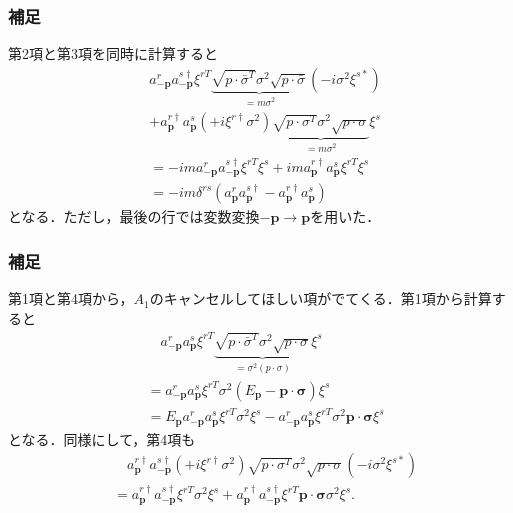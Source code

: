 \documentclass[pdflatex,unicode,ja=standard,12pt]{beamer}
\begin{document}
\begin{frame}[noframenumbering]
  
  \frametitle{補足\ \subsecname}
  \thispagestyle{empty}

  第2項と第3項を同時に計算すると
  \begin{align}
    &
    a_{-\mathbf{p}}^ra_{-\mathbf{p}}^{s\dag}
    \xi^{rT}
    \underbrace{
      \sqrt{p\cdot\bar{\sigma}^{T}}
      \sigma^2
      \sqrt{p\cdot\bar{\sigma}}
    }_{=m\sigma^2}
    (-i\sigma^2\xi^{s*})
    \nonumber
    \\
    &
    +
    a_{\mathbf{p}}^{r\dag}a_{\mathbf{p}}^s
    (+i\xi^{r\dag}\sigma^2)
    \underbrace{
      \sqrt{p\cdot\sigma^{T}}
      \sigma^2
      \sqrt{p\cdot\sigma}
    }_{=m\sigma^2}
    \xi^s
    \nonumber
    \\
    &=
    -im
    a_{-\mathbf{p}}^ra_{-\mathbf{p}}^{s\dag}
    \xi^{rT}\xi^s
    +
    im
    a_{\mathbf{p}}^{r\dag}a_{\mathbf{p}}^s
    \xi^{rT}\xi^s
    \nonumber
    \\
    &=
    -im\delta^{rs}
    (
      a_{\mathbf{p}}^ra_{\mathbf{p}}^{s\dag}
      -
      a_{\mathbf{p}}^{r\dag}a_{\mathbf{p}}^s
    )
  \end{align}
  となる．ただし，最後の行では変数変換$-\mathbf{p}\rightarrow\mathbf{p}$を用いた．

\end{frame}



\begin{frame}[noframenumbering]
  
  \frametitle{補足\ \subsecname}
  \thispagestyle{empty}

  第1項と第4項から，$A_1$のキャンセルしてほしい項がでてくる．第1項から計算すると
  \begin{align}
    &\quad
    a_{-\mathbf{p}}^ra_{\mathbf{p}}^s
    \xi^{rT}
    \underbrace{
      \sqrt{p\cdot\bar{\sigma}^T}\sigma^2\sqrt{p\cdot\sigma}
    }_{=\sigma^2(p\cdot\sigma)}
    \xi^s
    \nonumber
    \\
    &=
    a_{-\mathbf{p}}^ra_{\mathbf{p}}^s
    \xi^{rT}
    \sigma^2
    (
      E_{\mathbf{p}}
      -
      \mathbf{p}\cdot\bm{\sigma}
    )
    \xi^s
    \nonumber
    \\
    &=
    E_{\mathbf{p}}a_{-\mathbf{p}}^ra_{\mathbf{p}}^s
    \xi^{rT}
    \sigma^2
    \xi^s
    -
    a_{-\mathbf{p}}^ra_{\mathbf{p}}^s
    \xi^{rT}\sigma^2
    \mathbf{p}\cdot\bm{\sigma}
    \xi^s
  \end{align}
  となる．同様にして，第4項も
  \begin{align}
    &\quad
    a_{\mathbf{p}}^{r\dag}a_{-\mathbf{p}}^{s\dag}
    (+i\xi^{r\dag}\sigma^2)
    \sqrt{p\cdot\sigma^{T}}\sigma^2\sqrt{p\cdot\sigma}
    (-i\sigma^2\xi^{s*})
    \nonumber
    \\
    &=    
    a_{\mathbf{p}}^{r\dag}a_{-\mathbf{p}}^{s\dag}
    \xi^{rT}\sigma^2\xi^s
    +
    a_{\mathbf{p}}^{r\dag}a_{-\mathbf{p}}^{s\dag}
    \xi^{rT}\mathbf{p}\cdot\bm{\sigma}\sigma^2\xi^s
    .
  \end{align}

\end{frame}
\end{document}

